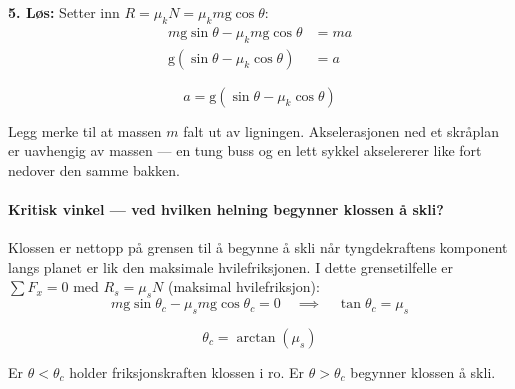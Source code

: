 \smallskip\noindent
\textbf{5. Løs:} Setter inn $R = \mu_k N = \mu_k m\mathrm{g}\cos\theta$:
\begin{align*}
    m\mathrm{g}\sin\theta - \mu_k m\mathrm{g}\cos\theta &= ma\\
    \mathrm{g}(\sin\theta - \mu_k\cos\theta) &= a
\end{align*}

\begin{tcolorbox}[colback=gray!13, colframe=gray!40, boxrule=0.5pt, top=5pt, bottom=5pt, left=8pt, right=8pt]
\[
    a = \mathrm{g}(\sin\theta - \mu_k\cos\theta)
\]
\end{tcolorbox}

\noindent
Legg merke til at massen $m$ falt ut av ligningen. Akselerasjonen ned et skråplan er uavhengig av massen — en tung buss og en lett sykkel akselererer like fort nedover den samme bakken.

\medskip

\paragraph*{Kritisk vinkel — ved hvilken helning begynner klossen å skli?}

Klossen er nettopp på grensen til å begynne å skli når tyngdekraftens komponent langs planet er lik den maksimale hvilefriksjonen. I dette grensetilfelle er $\sum F_x = 0$ med $R_s = \mu_s N$ (maksimal hvilefriksjon):
\[
m\mathrm{g}\sin\theta_c - \mu_s m\mathrm{g}\cos\theta_c = 0
\quad\implies\quad
\tan\theta_c = \mu_s
\]

\begin{tcolorbox}[colback=gray!13, colframe=gray!40, boxrule=0.5pt, top=5pt, bottom=5pt, left=8pt, right=8pt]
\[
    \theta_c = \arctan(\mu_s)
\]
\end{tcolorbox}

\noindent
Er $\theta < \theta_c$ holder friksjonskraften klossen i ro. Er $\theta > \theta_c$ begynner klossen å skli.


\medskip

